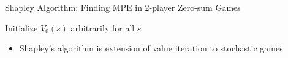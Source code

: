 \documentclass[11pt,aspectratio=169,handout]{beamer}
\begin{document}
  
  \begin{frame}{Shapley Algorithm: Finding MPE in 2-player Zero-sum Games}
   \begin{algorithm*}[H]
    Initialize $V_0(s)$ arbitrarily for all $s$
   \end{algorithm*}
   \vspace{2em}
   \begin{itemize}
    \item<2-> Shapley's algorithm is \alert{extension of value iteration} to stochastic games
   \end{itemize}
  \end{frame}
  
\end{document}
